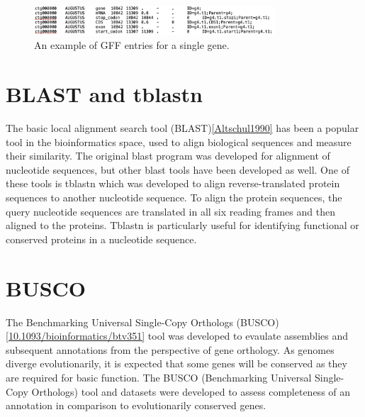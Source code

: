 \begin{figure}
  \centering
  \includegraphics[width=0.8\textwidth]{figures/gff-example.png}
  \caption{An example of GFF entries for a single gene.}
  \label{fig:gff-example}
\end{figure}

\section{BLAST and tblastn}
The basic local	alignment search tool (BLAST)\ref{Altschul1990}	has
been a popular tool in the bioinformatics space, used to align
biological sequences and measure their similarity. The original	blast
program was developed for alignment of nucleotide sequences, but other
blast tools have been developed as well. One of these tools is tblastn
which was developed to align reverse-translated protein sequences to
another nucleotide sequence. To align the protein sequences, the query
nucleotide sequences are translated in all six reading frames and then
aligned to the proteins.  Tblastn is particularly useful for
identifying functional or conserved proteins in	a nucleotide sequence.

\section{BUSCO}
The Benchmarking Universal Single-Copy Orthologs
(BUSCO)\ref{10.1093/bioinformatics/btv351} tool was developed to
evaulate assemblies and subsequent annotations from the perspective of
gene orthology. As genomes diverge evolutionarily, it is expected that
some genes will be conserved as they are required for basic
function. The BUSCO (Benchmarking Universal Single-Copy Orthologs)
tool and datasets were developed to assess completeness of an
annotation in comparison to evolutionarily conserved genes.
